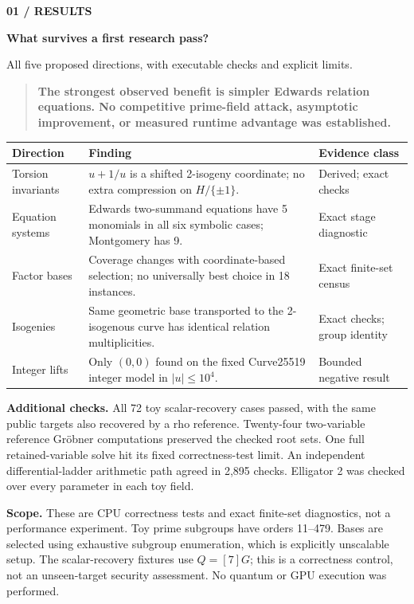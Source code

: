 \documentclass[11pt]{article}
\newcommand{\titleline}[2]{{\small\color{teal}\textbf{#1}}\par{\LARGE\color{ink}\textbf{#2}}\par\vspace{3mm}}
\newcommand{\note}[1]{\begin{quote}\color{teal}\textbf{#1}\end{quote}}
\begin{document}
\titleline{01 / RESULTS}{What survives a first research pass?}
{\large All five proposed directions, with executable checks and explicit limits.}
\note{The strongest observed benefit is simpler Edwards relation equations. No competitive prime-field attack, asymptotic improvement, or measured runtime advantage was established.}

\begin{tabular}{@{}p{32mm}p{72mm}p{39mm}@{}}\toprule
Direction & Finding & Evidence class\\\midrule
Torsion invariants & $u+1/u$ is a shifted 2-isogeny coordinate; no extra compression on $H/\{\pm1\}$. & Derived; exact checks\\[2mm]
Equation systems & Edwards two-summand equations have 5 monomials in all six symbolic cases; Montgomery has 9. & Exact stage diagnostic\\[2mm]
Factor bases & Coverage changes with coordinate-based selection; no universally best choice in 18 instances. & Exact finite-set census\\[2mm]
Isogenies & Same geometric base transported to the 2-isogenous curve has identical relation multiplicities. & Exact checks; group identity\\[2mm]
Integer lifts & Only $(0,0)$ found on the fixed Curve25519 integer model in $|u|\le10^4$. & Bounded negative result\\\bottomrule
\end{tabular}

\textbf{Additional checks.} All 72 toy scalar-recovery cases passed, with the same public targets also recovered by a rho reference. Twenty-four two-variable reference Gr\"obner computations preserved the checked root sets. One full retained-variable solve hit its fixed correctness-test limit. An independent differential-ladder arithmetic path agreed in 2,895 checks. Elligator 2 was checked over every parameter in each toy field.

\textbf{Scope.} These are CPU correctness tests and exact finite-set diagnostics, not a performance experiment. Toy prime subgroups have orders 11--479. Bases are selected using exhaustive subgroup enumeration, which is explicitly unscalable setup. The scalar-recovery fixtures use $Q=[7]G$; this is a correctness control, not an unseen-target security assessment. No quantum or GPU execution was performed.
\end{document}
